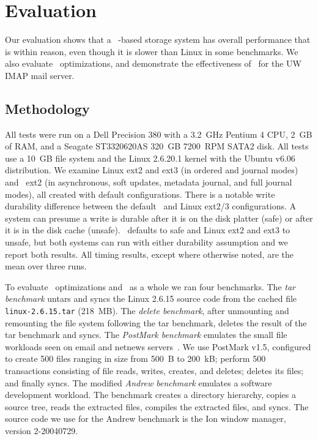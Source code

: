 \section {Evaluation}
\label{sec:evaluation}

Our evaluation shows that a \Kudos\ \patch-based storage system has
overall performance that is within reason, even though it is slower
than Linux in some benchmarks. We also evaluate \patch\ optimizations,
and demonstrate the effectiveness of \patchgroups\ for the UW IMAP
mail server.
%

\subsection{Methodology}

All tests were run on a Dell Precision 380 with a 3.2~GHz Pentium 4
CPU, 2~GB of RAM, and a Seagate ST3320620AS 320~GB 7200~RPM SATA2 disk.
%
All tests use a 10~GB file system and the Linux 2.6.20.1 kernel
with the Ubuntu v6.06 distribution.
%
We examine Linux ext2 and ext3 (in ordered and journal modes) and
\Kudos\ ext2 (in asynchronous, soft updates, metadata journal, and
full journal modes), all created with default configurations.
%
There is a notable write durability difference between the default
\Kudos\ and Linux ext2/3 configurations. A system can presume a write
is durable after it is on the disk platter (safe) or after it is in
the disk cache (unsafe). \Kudos\ defaults to safe and Linux ext2 and
ext3 to unsafe, but both systems can run with either durability
assumption and we report both results.
%
All timing results, except where otherwise noted, are the mean over three runs.

To evaluate \patch\ optimizations and \Kudos\ as a whole we ran four
benchmarks.
%
The \emph{tar benchmark} untars and syncs the Linux 2.6.15 source code
from the cached file \texttt{linux-2.6.15.tar} (218~MB).
%
The \emph{delete benchmark}, after unmounting and remounting the file
system following the tar benchmark, deletes the result of the tar
benchmark and syncs.
%
The \emph{PostMark benchmark} emulates the small file workloads seen
on email and netnews servers~\cite{postmark}. We use PostMark v1.5,
configured to create 500 files ranging in size from 500~B to 200~kB;
perform 500 transactions consisting of file reads, writes, creates,
and deletes; deletes its files; and finally syncs.
%
The modified \emph{Andrew benchmark} emulates a software development
workload.  The benchmark creates a directory hierarchy, copies a
source tree, reads the extracted files, compiles the extracted files,
and syncs. The source code we use for the Andrew benchmark is the Ion
window manager, version 2-20040729.

